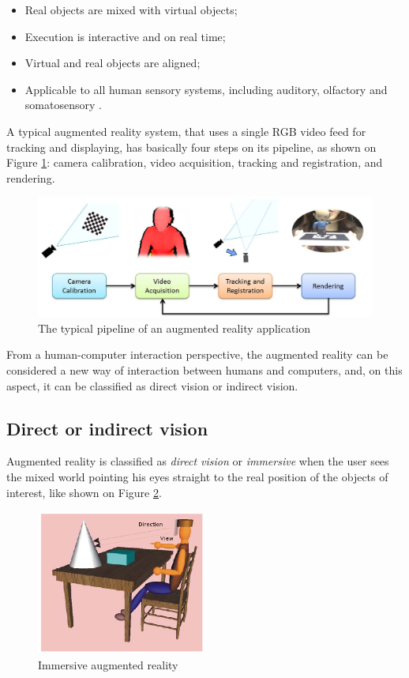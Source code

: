 \documentclass[msc, a4paper, classic, en]{ufbathesis}
\begin{document}
\begin{itemize}
  \item Real objects are mixed with virtual objects;
  \item Execution is interactive and on real time;
  \item Virtual and real objects are aligned;
  \item Applicable to all human sensory systems, including auditory, olfactory and somatosensory \cite{azuma01}.
\end{itemize}

A typical augmented reality system, that uses a single RGB video feed for tracking and displaying, has basically four steps on its pipeline, as shown on Figure \ref{fig:arpipeline}: camera calibration, video acquisition, tracking and registration, and rendering.

\begin{figure}
\centering
\includegraphics[width=1\textwidth]{images/arpipeline.png}
\caption{The typical pipeline of an augmented reality application \cite{gallo11}}
\label{fig:arpipeline}
\end{figure}

From a human-computer interaction perspective, the augmented reality can be considered a new way of interaction between humans and computers, and, on this aspect, it can be classified as direct vision or indirect vision.

\subsection{Direct or indirect vision}
\label{sec:dirind}

Augmented reality is classified as \textit{direct vision} or \textit{immersive} when the user sees the mixed world pointing his eyes straight to the real position of the objects of interest, like shown on Figure \ref{fig:direct}.

\begin{figure}
\centering
\includegraphics[width=0.5\textwidth]{images/direct.png}
\caption{Immersive augmented reality}
\label{fig:direct}
\end{figure}
\end{document}

